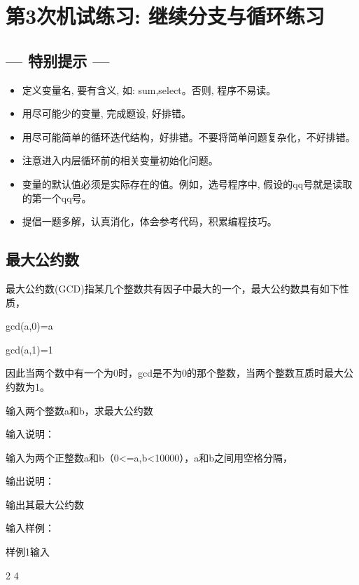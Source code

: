 %
%
%
\chapter{第3次机试练习: 继续分支与循环练习}

\section*{--- 特别提示 ---}

\begin{itemize}
	\item 定义变量名, 要有含义, 如: sum,select。否则, 程序不易读。
	\item 用尽可能少的变量, 完成题设, 好排错。
	\item 用尽可能简单的循环迭代结构，好排错。不要将简单问题复杂化，不好排错。
	\item 注意进入内层循环前的相关变量初始化问题。
	\item 变量的默认值必须是实际存在的值。例如，选号程序中, 假设的qq号就是读取的第一个qq号。
	\item 提倡一题多解，认真消化，体会参考代码，积累编程技巧。
\end{itemize}


\section{最大公约数}	 \label{gcd}

最大公约数(GCD)指某几个整数共有因子中最大的一个，最大公约数具有如下性质，

gcd(a,0)=a

gcd(a,1)=1

因此当两个数中有一个为0时，gcd是不为0的那个整数，当两个整数互质时最大公约数为1。

输入两个整数a和b，求最大公约数

输入说明：

输入为两个正整数a和b（0<=a,b<10000），a和b之间用空格分隔，

输出说明：

输出其最大公约数

输入样例：

样例1输入

2 4

